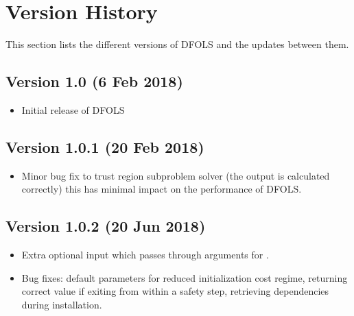 \documentclass[letterpaper,10pt,english]{sphinxmanual}
\begin{document}
\sphinxstepscope


\chapter{Version History}
\label{\detokenize{history:version-history}}\label{\detokenize{history::doc}}
\sphinxAtStartPar
This section lists the different versions of DFO\sphinxhyphen{}LS and the updates between them.


\section{Version 1.0 (6 Feb 2018)}
\label{\detokenize{history:version-1-0-6-feb-2018}}\begin{itemize}
\item {} 
\sphinxAtStartPar
Initial release of DFO\sphinxhyphen{}LS

\end{itemize}


\section{Version 1.0.1 (20 Feb 2018)}
\label{\detokenize{history:version-1-0-1-20-feb-2018}}\begin{itemize}
\item {} 
\sphinxAtStartPar
Minor bug fix to trust region subproblem solver (the output  is calculated correctly) \sphinxhyphen{} this has minimal impact on the performance of DFO\sphinxhyphen{}LS.

\end{itemize}


\section{Version 1.0.2 (20 Jun 2018)}
\label{\detokenize{history:version-1-0-2-20-jun-2018}}\begin{itemize}
\item {} 
\sphinxAtStartPar
Extra optional input  which passes through arguments for .

\item {} 
\sphinxAtStartPar
Bug fixes: default parameters for reduced initialization cost regime, returning correct value if exiting from within a safety step, retrieving dependencies during installation.

\end{itemize}
\end{document}
